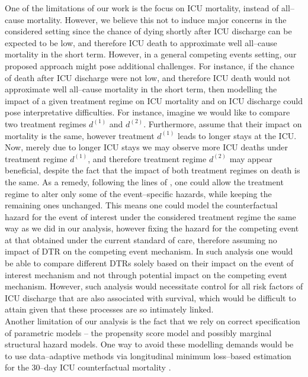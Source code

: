 \documentclass[12pt]{article}
\begin{document}
One of the limitations of our work is the focus on ICU mortality, instead of all--cause mortality. However, we believe this not to induce major concerns in the considered setting since the chance of dying shortly after ICU discharge can be expected to be low, and therefore ICU death to approximate well all--cause mortality in the short term. However, in a general competing events setting, our proposed approach might pose additional challenges.  For instance, if the chance of death after ICU discharge were not low, and therefore ICU death would not approximate well all--cause mortality in the short term,  then modelling the impact of a given treatment regime on ICU mortality and on ICU discharge could pose interpretative difficulties.  For instance, imagine we would like to compare two treatment regimes $d^{(1)}$ and $d^{(2)}$. Furthermore, assume that their impact on mortality is the same, however treatment $d^{(1)}$ leads to longer stays at the ICU. Now, merely due to longer ICU stays we may observe more ICU deaths under treatment regime $d^{(1)}$, and therefore treatment regime $d^{(2)}$ may appear beneficial, despite the fact that the impact of both treatment regimes on death is the same.  As a remedy, following the lines of \cite{Gran2015}, one could allow the treatment regime to alter only some of the event--specific hazards, while keeping the remaining ones unchanged.  This means one could model the counterfactual hazard for the event of interest under the considered treatment regime the same way as we did in our analysis, however fixing the hazard for the competing event at that obtained under the current standard of care, therefore assuming no impact of DTR on the competing event mechanism. In such analysis one would be able to compare different DTRs solely based on their impact on the event of interest mechanism and not through potential impact on the competing event mechanism. However, such analysis would necessitate control for all risk factors of ICU discharge that are also associated with survival, which would be difficult to attain given that these processes are so intimately linked.
\\
\indent
Another limitation of our analysis is the fact that we rely on correct specification of parametric models -- the propensity score model and possibly marginal structural hazard models. One way to avoid these modelling demands would be to use data--adaptive methods via longitudinal minimum loss--based estimation for the $30$--day ICU counterfactual mortality \citep{Petersen2014, Lendle2017}. 
\\
\end{document}

